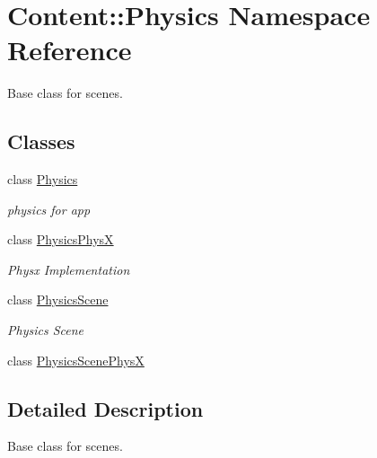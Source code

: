 \hypertarget{namespaceContent_1_1Physics}{
\section{Content::Physics Namespace Reference}
\label{namespaceContent_1_1Physics}
}


Base class for scenes.  
\subsection*{Classes}
\begin{DoxyCompactItemize}
\item 
class \hyperlink{classContent_1_1Physics_1_1Physics}{Physics}
\begin{DoxyCompactList}\small\item\em physics for app \item\end{DoxyCompactList}\item 
class \hyperlink{classContent_1_1Physics_1_1PhysicsPhysX}{PhysicsPhysX}
\begin{DoxyCompactList}\small\item\em Physx Implementation \item\end{DoxyCompactList}\item 
class \hyperlink{classContent_1_1Physics_1_1PhysicsScene}{PhysicsScene}
\begin{DoxyCompactList}\small\item\em Physics Scene \item\end{DoxyCompactList}\item 
class \hyperlink{classContent_1_1Physics_1_1PhysicsScenePhysX}{PhysicsScenePhysX}
\end{DoxyCompactItemize}


\subsection{Detailed Description}
Base class for scenes. 